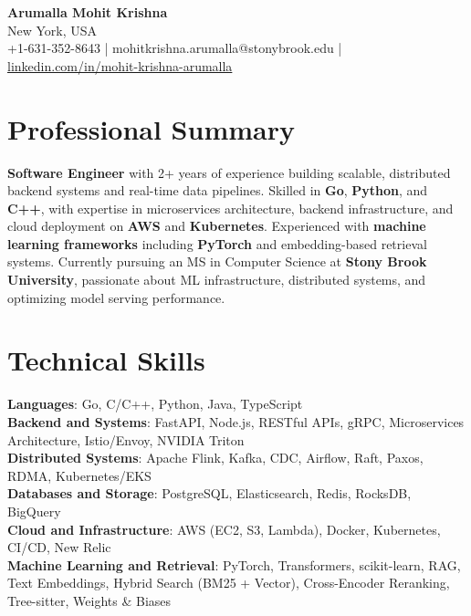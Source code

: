\documentclass[letterpaper,11pt]{article}
\begin{document}
\begin{center}
  {\Large \textbf{Arumalla Mohit Krishna}} \\
  New York, USA \\
  +1-631-352-8643 \enspace | \enspace mohitkrishna.arumalla@stonybrook.edu \enspace | \enspace \href{https://www.linkedin.com/in/mohit-krishna-arumalla}{linkedin.com/in/mohit-krishna-arumalla}
\end{center}

\section{Professional Summary}
  \begin{itemize}[leftmargin=0.15in, label={}]
    \small{\item{
     \textbf{Software Engineer} with 2+ years of experience building scalable, distributed backend systems and real-time data pipelines. Skilled in \textbf{Go}, \textbf{Python}, and \textbf{C++}, with expertise in microservices architecture, backend infrastructure, and cloud deployment on \textbf{AWS} and \textbf{Kubernetes}. Experienced with \textbf{machine learning frameworks} including \textbf{PyTorch} and embedding-based retrieval systems. Currently pursuing an MS in Computer Science at \textbf{Stony Brook University}, passionate about ML infrastructure, distributed systems, and optimizing model serving performance.
    }}
  \end{itemize}
\vspace{-16pt}

\section{Technical Skills}
 \begin{itemize}[leftmargin=0.15in, label={}]
    \small{\item{
     \textbf{Languages}: Go, C/C++, Python, Java, TypeScript \\
     \textbf{Backend and Systems}: FastAPI, Node.js, RESTful APIs, gRPC, Microservices Architecture, Istio/Envoy, NVIDIA Triton \\
     \textbf{Distributed Systems}: Apache Flink, Kafka, CDC, Airflow, Raft, Paxos, RDMA, Kubernetes/EKS \\
     \textbf{Databases and Storage}: PostgreSQL, Elasticsearch, Redis, RocksDB, BigQuery \\
     \textbf{Cloud and Infrastructure}: AWS (EC2, S3, Lambda), Docker, Kubernetes, CI/CD, New Relic \\
     \textbf{Machine Learning and Retrieval}: PyTorch, Transformers, scikit-learn, RAG, Text Embeddings, Hybrid Search (BM25 + Vector), Cross-Encoder Reranking, Tree-sitter, Weights \& Biases
    }}
 \end{itemize}
\vspace{-16pt}
\end{document}
